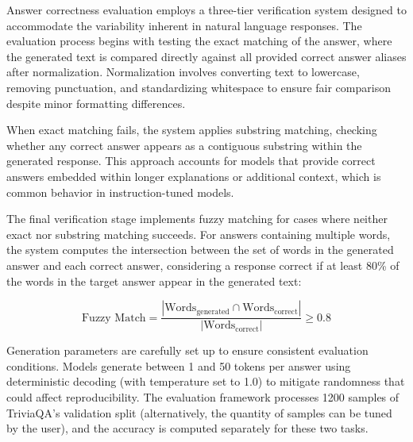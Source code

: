 Answer correctness evaluation employs a three-tier verification system designed to accommodate the variability inherent in natural language responses. The evaluation process begins with testing the exact matching of the answer, where the generated text is compared directly against all provided correct answer aliases after normalization. Normalization involves converting text to lowercase, removing punctuation, and standardizing whitespace to ensure fair comparison despite minor formatting differences.

When exact matching fails, the system applies substring matching, checking whether any correct answer appears as a contiguous substring within the generated response. This approach accounts for models that provide correct answers embedded within longer explanations or additional context, which is common behavior in instruction-tuned models.

The final verification stage implements fuzzy matching for cases where neither exact nor substring matching succeeds. For answers containing multiple words, the system computes the intersection between the set of words in the generated answer and each correct answer, considering a response correct if at least 80\% of the words in the target answer appear in the generated text:

\begin{equation}
\text{Fuzzy Match} = \frac{|\text{Words}_{\text{generated}} \cap \text{Words}_{\text{correct}}|}{|\text{Words}_{\text{correct}}|} \geq 0.8
\end{equation}

Generation parameters are carefully set up to ensure consistent evaluation conditions. Models generate between 1 and 50 tokens per answer using deterministic decoding (with temperature set to 1.0) to mitigate randomness that could affect reproducibility. The evaluation framework processes 1200 samples of TriviaQA's validation split (alternatively, the quantity of samples can be tuned by the user), and the accuracy is computed separately for these two tasks.